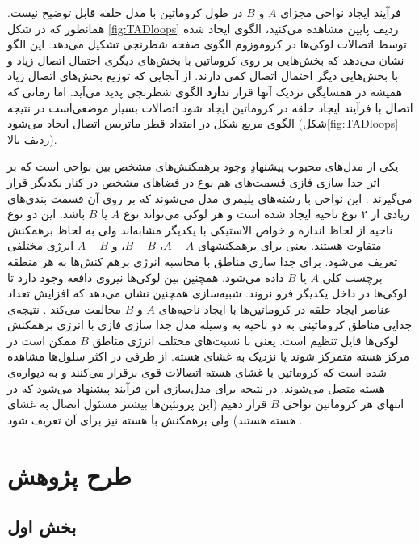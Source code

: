 فرآیند ایجاد نواحی مجزای $A$ و $B$ در طول کروماتین با مدل حلقه قابل توضیح نیست. همانطور که در شکل \ref{fig:TADloops} ردیف پایین مشاهده می‌کنید، الگوی ایجاد شده توسط اتصالات لوکی‌ها در کروموزوم الگوی صفحه شطرنجی تشکیل می‌دهد. این الگو نشان می‌دهد که بخش‌هایی بر روی کروماتین با بخش‌های دیگری احتمال اتصال زیاد و با بخش‌هایی دیگر احتمال اتصال کمی دارند. از آنجایی که توزیع بخش‌های اتصال زیاد همیشه در همسایگی نزدیک آنها قرار \textbf{ندارد} الگوی شطرنجی پدید می‌آید. اما زمانی که اتصال با فرآیند ایجاد حلقه در کروماتین ایجاد ‌شود اتصالات بسیار موضعی‌است در نتیجه الگوی مربع شکل در امتداد قطر ماتریس اتصال ایجاد می‌شود (شکل\ref{fig:TADloops} ردیف بالا).
 
 یکی از مدل‌های محبوب پیشنهادِ وجود برهمکنش‌های مشخص بین نواحی است که بر اثر جدا سازی فازی قسمت‌های هم نوع در فضاهای مشخص در کنار یکدیگر قرار می‌گیرند \cite{Nuebler196261}. این نواحی با رشته‌های پلیمری مدل می‌شوند که بر روی‌ آن قسمت بندی‌های زیادی از ۲ نوع ناحیه ایجاد شده است و هر لوکی می‌تواند نوع $A$ یا $B$ باشد. این دو نوع ناحیه از لحاظ اندازه و خواص الاستیکی با یکدیگر مشابه‌اند ولی به لحاظ برهمکنش متفاوت هستند.  یعنی برای برهمکنشهای $A-A$، $B-B$، و $A-B$ انرژی مختلفی تعریف می‌شود. برای جدا سازی مناطق با محاسبه انرژی برهم کنش‌ها به هر منطقه برچسب کلی $A$ یا $B$ داده می‌شود. همچنین بین لوکی‌ها نیروی دافعه وجود دارد تا لوکی‌ها در داخل یکدیگر فرو نروند.
شبیه‌سازی همچنین نشان می‌دهد که افزایش تعداد عناصر ایجاد حلقه در کروماتین‌ها با ایجاد ناحیه‌های $A$ و $B$ مخالفت می‌کند \cite{Nuebler196261}.
نتیجه‌ی جدایی مناطق کروماتینی به دو ناحیه به وسیله مدل جدا سازی فازی با انرژی برهمکنش لوکی‌ها قایل تنظیم است. یعنی با نسبت‌های مختلف انرژی مناطق $B$ ممکن است در مرکز هسته  متمرکز شوند یا نزدیک به غشای هسته. از طرفی در اکثر سلول‌ها مشاهده شده است که کروماتین با غشای هسته اتصالات قوی برقرار می‌کنند و به دیواره‌ی هسته متصل می‌شوند. در نتیجه‌ برای مدل‌سازی این فرآیند پیشنهاد می‌شود که در انتهای هر کروماتین نواحی $B$ قرار دهیم (این پروتئین‌ها بیشتر مسئول اتصال به غشای هسته هستند) ولی برهمکنش با هسته نیز برای آن تعریف شود  \cite{Nuebler196261}.







\clearpage
\section{طرح پژوهش}
\subsection{بخش اول}

